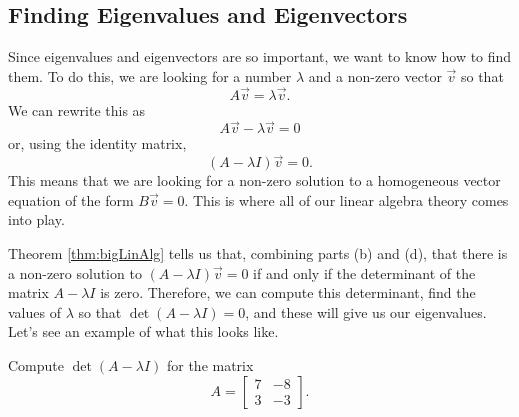 \documentclass{ximera}
\begin{document}
\subsection{Finding Eigenvalues and Eigenvectors}

Since eigenvalues and eigenvectors are so important, we want to know how to find them. To do this, we are looking for a number $\lambda$ and a non-zero vector $\vec{v}$ so that 
\[ 
    A\vec{v} = \lambda\vec{v}. 
\] 
We can rewrite this as 
\[
    A\vec{v} - \lambda \vec{v} = 0 
\] 
or, using the identity matrix, 
\[ 
    (A - \lambda I)\vec{v} = 0. 
\] 
This means that we are looking for a non-zero solution to a homogeneous vector equation of the form $B\vec{v} = 0$. This is where all of our linear algebra theory comes into play.

Theorem \ref{thm:bigLinAlg} tells us that, combining parts (b) and (d), that there is a non-zero solution to $(A - \lambda I)\vec{v} = 0$ if and only if the determinant of the matrix $A - \lambda I$ is zero. Therefore, we can compute this determinant, find the values of $\lambda$ so that $\det(A - \lambda I) = 0$, and these will give us our eigenvalues. Let's see an example of what this looks like.

\begin{example}
    Compute $\det(A - \lambda I)$ for the matrix 
    \[ 
        A = 
        \begin{bmatrix} 
            7 & -8 \\ 
            3 & -3 
        \end{bmatrix}.
    \]
\end{example}
\end{document}
